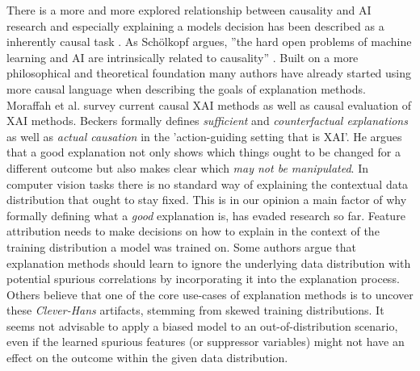 There is a more and more explored relationship between causality and AI research and especially explaining a models decision has been described as a inherently causal task \cite{Moraffah2020a, Beckers2022, Halpern2005a}.
As Schölkopf argues, ''the hard open problems of machine learning and AI are intrinsically related to causality'' \cite{Schoelkopf2019}.
Built on a more philosophical and theoretical foundation \cite{Woodward2004, Halpern2005,Halpern2005a, Schoelkopf2019} many authors have already started using more causal language when describing the goals of explanation methods. Moraffah et al. \cite{Moraffah2020a} survey current causal XAI methods as well as causal evaluation of XAI methods. Beckers \cite{Beckers2022} formally defines \textit{sufficient} and \textit{counterfactual explanations} as well as \textit{actual causation} in the 'action-guiding setting that is XAI'. He argues that a good explanation not only shows which things ought to be changed for a different outcome but also makes clear which \textit{may not be manipulated}. In computer vision tasks there is no standard way of explaining the contextual data distribution that ought to stay fixed. This is in our opinion a main factor of why formally defining what a \textit{good} explanation is, has evaded research so far. 
Feature attribution needs to make decisions on how to explain in the context of the training distribution a model was trained on.
Some authors \cite{Kindermans2017,Wilming2023, Wilming2022} argue that explanation methods should learn to ignore the underlying data distribution with potential spurious correlations by incorporating it into the explanation process. Others believe that one of the core use-cases of explanation methods is to uncover these \textit{Clever-Hans} artifacts, stemming from skewed training distributions. It seems not advisable to apply a biased model to an out-of-distribution scenario, even if the learned spurious features (or suppressor variables) might not have an effect on the outcome within the given data distribution.\\


